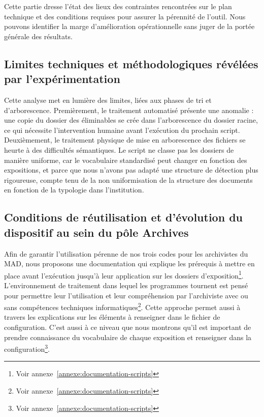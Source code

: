 Cette partie dresse l'état des lieux des contraintes rencontrées sur le plan technique et des conditions requises pour assurer la pérennité de l'outil. Nous pouvons identifier la marge d'amélioration opérationnelle sans juger de la portée générale des résultats.


\subsection*{Limites techniques et méthodologiques révélées par l'expérimentation}

Cette analyse met en lumière des limites, liées aux phases de tri et d'arborescence. Premièrement, le traitement automatisé présente une anomalie : une copie du dossier des éliminables se crée dans l'arborescence du dossier racine, ce qui nécessite l'intervention humaine avant l'exécution du prochain script. Deuxièmement, le traitement physique de mise en arborescence des fichiers se heurte à des difficultés sémantiques. Le script ne classe pas les dossiers de manière uniforme, car le vocabulaire standardisé peut changer en fonction des expositions, et parce que nous n'avons pas adapté une structure de détection plus rigoureuse, compte tenu de la non uniformisation de la structure des documents en fonction de la typologie dans l'institution. 

\subsection*{Conditions de réutilisation et d’évolution du dispositif au sein du pôle Archives}

Afin de garantir l'utilisation pérenne de nos trois codes pour les archivistes du MAD, nous proposons une documentation qui explique les prérequis à mettre en place avant l’exécution jusqu'à leur application sur les dossiers d'exposition\footnote{Voir annexe~\ref{annexe:documentation-scripts}}. L'environnement de traitement dans lequel les programmes tournent est pensé pour permettre leur l'utilisation et leur compréhension par l'archiviste avec ou sans compétences techniques informatiques\footnote{Voir annexe~\ref{annexe:documentation-scripts}}. 
Cette approche permet aussi à travers les explications sur les éléments à renseigner dans le fichier de configuration. C'est aussi à ce niveau que nous montrons qu'il est important de prendre connaissance du vocabulaire de chaque exposition et renseigner dans la configuration\footnote{Voir annexe~\ref{annexe:documentation-scripts}}.\\[0.1cm]

